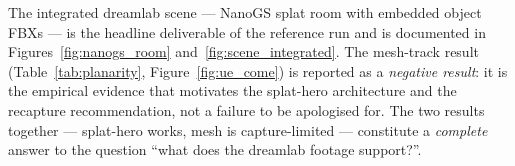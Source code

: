 The integrated dreamlab scene --- NanoGS splat room with embedded object FBXs --- is the
headline deliverable of the reference run and is documented in
Figures~\ref{fig:nanogs_room} and~\ref{fig:scene_integrated}.  The mesh-track result
(Table~\ref{tab:planarity}, Figure~\ref{fig:ue_come}) is reported as a
\emph{negative result}: it is the empirical evidence that motivates the splat-hero
architecture and the recapture recommendation, not a failure to be apologised for.  The
two results together --- splat-hero works, mesh is capture-limited --- constitute a
\emph{complete} answer to the question ``what does the dreamlab footage support?''.
